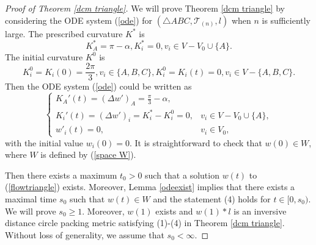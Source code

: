 \documentclass[12pt]{amsart}
\begin{document}
\begin{proof}[Proof of Theorem \ref{dcm triangle}]
    We will prove Theorem \ref{dcm triangle} by considering the ODE system  (\ref{ode}) for $(\triangle ABC, \mathcal{T}_{(n)}, l)$ when $n$ is sufficiently large. The prescribed curvature $K^*$ is
$$K_A^* = \pi  - \alpha, K_i^* = 0, v_i \in V - {V_0} \cup \{ A\}.$$
	The initial curvature ${K^0}$ is
$$K_i^0 = K_i(0) = \frac{2\pi }{3},v_i \in \{ A,B,C\},
			K_i^0 = K_i(t) = 0,v_i \in V - \{ A,B,C\}.$$
Then the ODE system  (\ref{ode}) could be written as
	\begin{equation} \label{flowtriangle}  \left\{ {\begin{array}{lr}
				{K_A}'(t) = {{(\Delta w')}_A} =\frac{\pi }{3} - \alpha, &\quad \\
				{K_i}'(t) = {{(\Delta w')}_i} = K_i^* - K_i^0 = 0,&v_i \in V - {V_0} \cup \{ A\}, \\
				{w'_i}(t) = 0,& v_i \in {V_0},
		\end{array}} \right.
	 \end{equation}
	 with the initial value ${w_i}(0) = 0$. It is straightforward to check that $w(0)\in W$, where $W$ is defined by (\ref{space W}).

   Then there exists a maximum ${t_0} > 0$ such that a solution $w(t)$ to (\ref{flowtriangle}) exists. Moreover, Lemma \ref{odeexist} implies that there exists a maximal time $s_0$ such that $w(t) \in W$ and the statement (4) holds for $t\in [0, s_0)$. We will prove $s_0\geq 1$. Moreover, $w(1)$ exists and $w(1)*l$ is an inversive distance circle packing metric satisfying (1)-(4) in Theorem \ref{dcm triangle}. Without loss of generality, we assume that $s_0<\infty$.


\end{proof}
\end{document}
